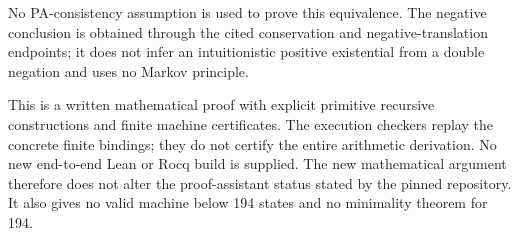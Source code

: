 No PA-consistency assumption is used to prove this equivalence.  The
negative conclusion is obtained through the cited conservation and
negative-translation endpoints; it does not infer an intuitionistic
positive existential from a double negation and uses no Markov principle.

This is a written mathematical proof with explicit primitive recursive
constructions and finite machine certificates.  The execution checkers
replay the concrete finite bindings; they do not certify the entire
arithmetic derivation.  No new end-to-end Lean or Rocq build is supplied.
The new mathematical argument therefore does not alter the proof-assistant
status stated by the pinned repository.  It also gives no valid machine
below 194 states and no minimality theorem for 194.
